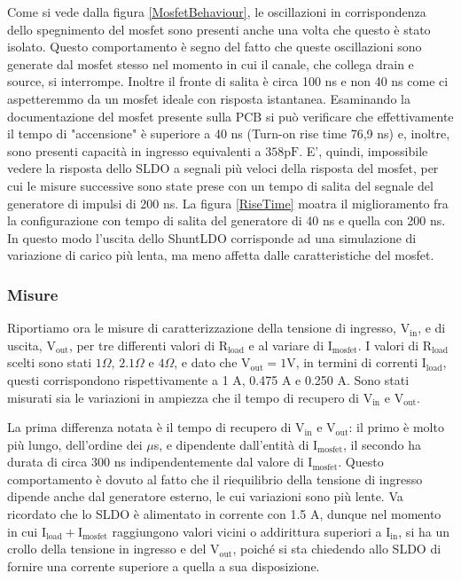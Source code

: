 Come si vede dalla figura \ref{MosfetBehaviour}, le oscillazioni in corrispondenza dello spegnimento del mosfet sono presenti anche una volta che questo è stato isolato.
Questo comportamento è segno del fatto che queste oscillazioni sono generate dal mosfet stesso nel momento in cui il canale, che collega drain e source, si interrompe.
Inoltre il fronte di salita è circa 100 ns e non 40 ns come ci aspetteremmo da un mosfet ideale con risposta istantanea.
Esaminando la documentazione del mosfet presente sulla PCB 
si può verificare che effettivamente il tempo di "accensione" è superiore a 40 ns (Turn-on rise time 76,9 ns) e, inoltre, sono presenti capacità in ingresso equivalenti a $\mathrm{358 pF}$.
E', quindi, impossibile vedere la risposta dello SLDO a segnali più veloci della risposta del mosfet, per cui le misure successive sono state prese con un tempo di salita del segnale del generatore di impulsi di 200 ns.
La figura \ref{RiseTime} moatra il miglioramento fra la configurazione con tempo di salita del generatore di 40 ns e quella con 200 ns.
In questo modo l'uscita dello ShuntLDO corrisponde ad una simulazione di variazione di carico più lenta, ma meno affetta dalle caratteristiche del mosfet.

\subsubsection{Misure}

Riportiamo ora le misure di caratterizzazione della tensione di ingresso, $\mathrm{V_{in}}$, e di uscita, $\mathrm{V_{out}}$, per tre differenti valori di $\mathrm{R_{load}}$ e al variare di $\mathrm{I_{mosfet}}$.
I valori di $\mathrm{R_{load}}$ scelti sono stati $1 \Omega$, $2.1 \Omega$ e $4 \Omega$, e dato che $\mathrm{V_{out}=1V}$, in termini di correnti  $\mathrm{I_{load}}$, questi corrispondono rispettivamente a 1 A, 0.475 A e 0.250 A.
Sono stati misurati sia le variazioni in ampiezza che il tempo di recupero di $\mathrm{V_{in}}$ e $\mathrm{V_{out}}$.

La prima differenza notata è il tempo di recupero di $\mathrm{V_{in}}$ e $\mathrm{V_{out}}$: il primo è molto più lungo, dell'ordine dei $\mu$s, e dipendente dall'entità di $\mathrm{I_{mosfet}}$, il secondo ha durata di circa 300 ns indipendentemente dal valore di $\mathrm{I_{mosfet}}$.
Questo comportamento è dovuto al fatto che il riequilibrio della tensione di ingresso dipende anche dal generatore esterno, le cui variazioni sono più lente.
Va ricordato che lo SLDO è alimentato in corrente con 1.5 A, dunque nel momento in cui $\mathrm{I_{load}+I_{mosfet}}$ raggiungono valori vicini o addirittura superiori  a $\mathrm{I_{in}}$, si ha un crollo della tensione in ingresso e del $\mathrm{V_{out}}$, poiché si sta chiedendo allo SLDO di fornire una corrente superiore a quella a sua disposizione.

